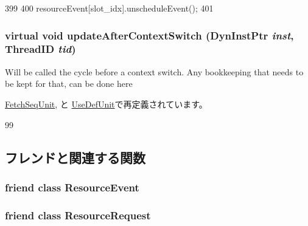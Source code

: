 \begin{DoxyCode}
399 {
400     resourceEvent[slot_idx].unscheduleEvent();
401 }
\end{DoxyCode}
\hypertarget{classResource_a2cf5450ce736e0c76aca0d4ef24b922a}{
\subsubsection[{updateAfterContextSwitch}]{\setlength{\rightskip}{0pt plus 5cm}virtual void updateAfterContextSwitch ({\bf DynInstPtr} {\em inst}, \/  {\bf ThreadID} {\em tid})}}
\label{classResource_a2cf5450ce736e0c76aca0d4ef24b922a}
Will be called the cycle before a context switch. Any bookkeeping that needs to be kept for that, can be done here 

\hyperlink{classFetchSeqUnit_a339073618ad3c21c492d64a55ce2e216}{FetchSeqUnit}, と \hyperlink{classUseDefUnit_a339073618ad3c21c492d64a55ce2e216}{UseDefUnit}で再定義されています。


\begin{DoxyCode}
99 { }    
\end{DoxyCode}


\subsection{フレンドと関連する関数}
\hypertarget{classResource_a80da161b04f097f36d40b2bb699192b6}{
\subsubsection[{ResourceEvent}]{\setlength{\rightskip}{0pt plus 5cm}friend class {\bf ResourceEvent}}}
\label{classResource_a80da161b04f097f36d40b2bb699192b6}
\hypertarget{classResource_ae78e4599e7afd86b067119e90ac5dfed}{
\subsubsection[{ResourceRequest}]{\setlength{\rightskip}{0pt plus 5cm}friend class {\bf ResourceRequest}}}
\label{classResource_ae78e4599e7afd86b067119e90ac5dfed}


